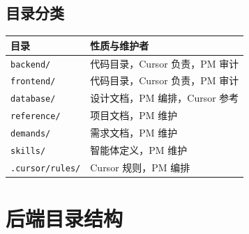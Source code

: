 \documentclass[11pt,a4paper]{article}
\begin{document}
\subsection{目录分类}

\begin{table}[h]
\centering
\begin{tabularx}{\linewidth}{lX}
\toprule
\textbf{目录} & \textbf{性质与维护者} \\
\midrule
\texttt{backend/} & 代码目录，Cursor 负责，PM 审计 \\
\texttt{frontend/} & 代码目录，Cursor 负责，PM 审计 \\
\texttt{database/} & 设计文档，PM 编排，Cursor 参考 \\
\texttt{reference/} & 项目文档，PM 维护 \\
\texttt{demands/} & 需求文档，PM 维护 \\
\texttt{skills/} & 智能体定义，PM 维护 \\
\texttt{.cursor/rules/} & Cursor 规则，PM 编排 \\
\bottomrule
\end{tabularx}
\end{table}

\section{后端目录结构}
\end{document}
